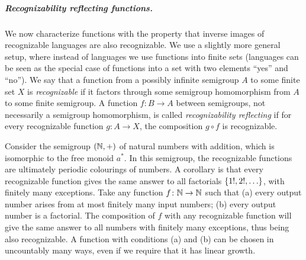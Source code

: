 \subparagraph{Recognizability reflecting functions.} We now characterize functions with the property that inverse images of recognizable languages are also recognizable. We use a slightly more general setup, where instead of languages we use functions into finite sets (languages can be seen as the special case of functions into a set with two elements ``yes'' and ``no''). We say that a function from a possibly infinite semigroup $A$ to some finite set $X$ is \emph{recognizable} if it factors through some semigroup homomorphism from $A$ to some finite semigroup. 
 A function $f\colon B \to A$ between semigroups, not necessarily a semigroup homomorphism, is called \emph{recognizability reflecting} if for every recognizable function $g\colon A \to X$, the composition $g \circ f$ is recognizable. 


\begin{example}[Factorials]
 Consider the semigroup $({\mathbb N}, +)$ of natural numbers with addition, which is isomorphic to the free monoid $a^*$. In this semigroup, the recognizable functions are ultimately periodic colourings of numbers. A corollary is that every recognizable function gives the same answer to all factorials $\{1!,2!,\ldots\}$, with finitely many exceptions. Take any function $f\colon {\mathbb N} \to {\mathbb N}$ such that (a) every output number arises from at most finitely many input numbers; (b) every output number is a factorial. The composition of $f$ with any recognizable function will give the same answer to all numbers with finitely many exceptions, thus being also recognizable. A function with conditions (a) and (b) can be chosen in uncountably many ways, even if we require that it has linear growth.
\end{example}


